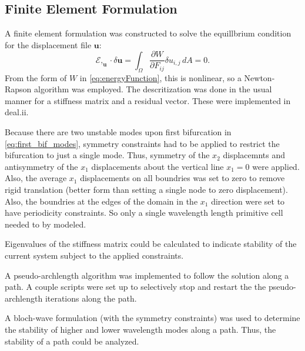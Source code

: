 \documentclass[11pt]{report}
\begin{document}
\begin{appendices}
  \chapter{Finite Element Formulation} \label{append_finite_element}
A finite element formulation was constructed to solve the equillbrium condition for the displacement file $\mathbf{u}$:
\begin{equation} \label{eq:FEM_eqbrm}
\mathcal{E},_{\mathbf{u}}\cdot \delta\mathbf{u} = \int_\Omega \frac{\partial W}{\partial {F_{ij}}} \delta u_{i,j} \,dA = 0.
\end{equation}
From the form of $W$ in \eqref{eq:energyFunction}, this is nonlinear, so a Newton-Rapson algorithm was employed. The descritization was done in the usual manner for a stiffness matrix and a residual vector. These were implemented in deal.ii.

Because there are two unstable modes upon first bifurcation in \eqref{eq:first_bif_modes}, symmetry constraints had to be applied to restrict the bifurcation to just a single mode. Thus, symmetry of the $x_2$ displacemnts and antisymmetry of the $x_1$ displacements about the vertical line $x_1 = 0$ were applied. Also, the average $x_1$ displacements on all boundries was set to zero to remove rigid translation (better form than setting a single node to zero displacement). Also, the boundries at the edges of the domain in the $x_1$ direction were set to have periodicity constraints. So only a single wavelength length primitive cell needed to by modeled.

Eigenvalues of the stiffness matrix could be calculated to indicate stability of the current system subject to the applied constraints.

A pseudo-archlength algorithm was implemented to follow the solution along a path. A couple scripts were set up to selectively stop and restart the the pseudo-archlength iterations along the path.

A bloch-wave formulation (with the symmetry constraints) was used to determine the stability of higher and lower wavelength modes along a path. Thus, the stability of a path could be analyzed.


\end{appendices}
\end{document}
